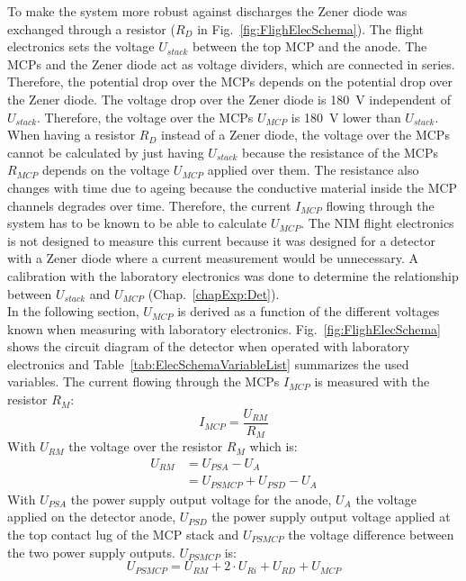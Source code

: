 	To make the system more robust against discharges the Zener diode was exchanged through a resistor ($R_D$ in Fig.~\ref{fig:FlighElecSchema}). The flight electronics sets the voltage $U_{stack}$ between the top MCP and the anode. The MCPs and the Zener diode act as voltage dividers, which are connected in series. Therefore, the potential drop over the MCPs depends on the potential drop over the Zener diode. The voltage drop over the Zener diode is 180~V independent of $U_{stack}$. Therefore, the voltage over the MCPs $U_{MCP}$ is 180~V lower than $U_{stack}$. When having a resistor $R_D$ instead of a Zener diode, the voltage over the MCPs cannot be calculated by just having $U_{stack}$ because the resistance of the MCPs $R_{MCP}$ depends on the voltage $U_{MCP}$ applied over them. The resistance also changes with time due to ageing because the conductive material inside the MCP channels degrades over time. Therefore, the current $I_{MCP}$ flowing through the system has to be known to be able to calculate $U_{MCP}$. The NIM flight electronics is not designed to measure this current because it was designed for a detector with a Zener diode where a current measurement would be unnecessary. A calibration with the laboratory electronics was done to determine the relationship between $U_{stack}$ and $U_{MCP}$ (Chap.~\ref{chapExp:Det}).\\
	In the following section, $U_{MCP}$ is derived as a function of the different voltages known when measuring with laboratory electronics. Fig.~\ref{fig:FlighElecSchema} shows the circuit diagram of the detector when operated with laboratory electronics and Table~\ref{tab:ElecSchemaVariableList} summarizes the used variables. The current flowing through the MCPs $I_{MCP}$ is measured with the resistor $R_M$:
	\begin{equation}
		I_{MCP} = \frac{U_{RM}}{R_{M}}
	\end{equation}
	With $U_{RM}$ the voltage over the resistor $R_{M}$ which is:
	\begin{align}
		U_{RM} &= U_{PSA} - U_{A}\\
			   &= U_{PSMCP} + U_{PSD} - U_A
	\end{align}
	With $U_{PSA}$ the power supply output voltage for the anode, $U_{A}$ the voltage applied on the detector anode, $U_{PSD}$ the power supply output voltage applied at the top contact lug of the MCP stack and $U_{PSMCP}$ the voltage difference between the two power supply outputs. $U_{PSMCP}$ is:
	\begin{equation}
		U_{PSMCP} = U_{RM} + 2\cdot U_{Ri} + U_{RD} + U_{MCP}
		\label{eq:UpsmcpTot}
	\end{equation}
